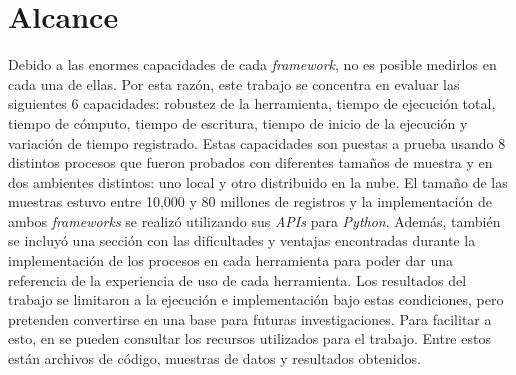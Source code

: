 \section*{Alcance}

Debido a las enormes capacidades de cada \textit{framework}, no es posible medirlos en cada una de ellas. Por esta razón, este trabajo se concentra en evaluar las siguientes 6 capacidades: robustez de la herramienta, tiempo de ejecución total, tiempo de cómputo, tiempo de escritura, tiempo de inicio de la ejecución y variación de tiempo registrado. Estas capacidades son puestas a prueba usando 8 distintos procesos que fueron probados con diferentes tamaños de muestra y en dos ambientes distintos: uno local y otro distribuido en la nube. El tamaño de las muestras estuvo entre 10,000 y 80 millones de registros y la implementación de ambos \textit{frameworks} se realizó utilizando sus \textit{APIs} para \textit{Python}. Además, también se incluyó una sección con las dificultades y ventajas encontradas durante la implementación de los procesos en cada herramienta para poder dar una referencia de la experiencia de uso de cada herramienta. Los resultados del trabajo se limitaron a la ejecución e implementación bajo estas condiciones, pero pretenden convertirse en una base para futuras investigaciones. Para facilitar a esto, en \cite{repo-spark-rita} se pueden consultar los recursos utilizados para el trabajo. Entre estos están archivos de código, muestras de datos y resultados obtenidos.



